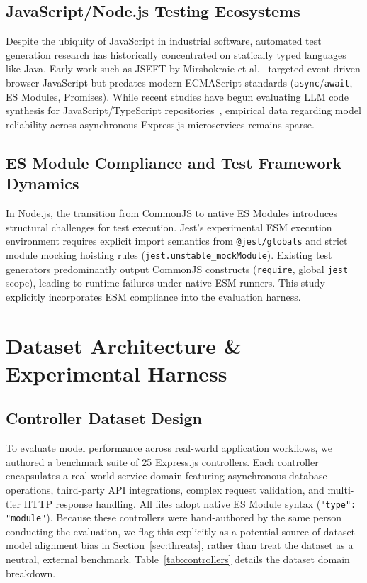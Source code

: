 \documentclass[conference]{IEEEtran}
\begin{document}
\subsection{JavaScript/Node.js Testing Ecosystems}

Despite the ubiquity of JavaScript in industrial software, automated test generation research has historically concentrated on statically typed languages like Java. Early work such as JSEFT by Mirshokraie et al.~\cite{mirshokraie2015jseft} targeted event-driven browser JavaScript but predates modern ECMAScript standards (\texttt{async}/\texttt{await}, ES Modules, Promises). While recent studies have begun evaluating LLM code synthesis for JavaScript/TypeScript repositories~\cite{schafer2024testpilot}, empirical data regarding model reliability across asynchronous Express.js microservices remains sparse.

\subsection{ES Module Compliance and Test Framework Dynamics}

In Node.js, the transition from CommonJS to native ES Modules introduces structural challenges for test execution. Jest's experimental ESM execution environment requires explicit import semantics from \texttt{@jest/globals} and strict module mocking hoisting rules (\texttt{jest.unstable\_mockModule}). Existing test generators predominantly output CommonJS constructs (\texttt{require}, global \texttt{jest} scope), leading to runtime failures under native ESM runners. This study explicitly incorporates ESM compliance into the evaluation harness.

\section{Dataset Architecture \& Experimental Harness}
\label{sec:dataset}

\subsection{Controller Dataset Design}

To evaluate model performance across real-world application workflows, we authored a benchmark suite of 25 Express.js controllers. Each controller encapsulates a real-world service domain featuring asynchronous database operations, third-party API integrations, complex request validation, and multi-tier HTTP response handling. All files adopt native ES Module syntax (\texttt{"type": "module"}). Because these controllers were hand-authored by the same person conducting the evaluation, we flag this explicitly as a potential source of dataset-model alignment bias in Section~\ref{sec:threats}, rather than treat the dataset as a neutral, external benchmark. Table~\ref{tab:controllers} details the dataset domain breakdown.
\end{document}
